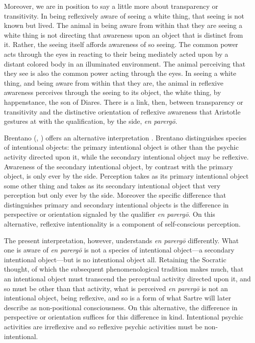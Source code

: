 Moreover, we are in position to say a little more about transparency or transitivity. In being reflexively aware of seeing a white thing, that seeing is not known but lived. The animal in being aware from within that they are seeing a white thing is not directing that awareness upon an object that is distinct from it. Rather, the seeing itself affords awareness of so seeing. The common power acts through the eyes in reacting to their being mediately acted upon by a distant colored body in an illuminated environment. The animal perceiving that they see is also the common power acting through the eyes. In seeing a white thing, and being aware from within that they are, the animal in reflexive awareness perceives through the seeing to its object, the white thing, by happenstance, the son of Diares. There is a link, then, between transparency or transitivity and the distinctive orientation of reflexive awareness that Aristotle gestures at with the qualification, by the side, \emph{en parergō}.

Brentano (\citeyear[2.2.8]{Brentano:1874aa}, \citeyear[1.4, 2.1]{Brentano:1929aa}) offers an alternative interpretation \citep[see][]{Textor:2017aa}. Brentano distinguishes species of intentional objects: the primary intentional object is other than the psychic activity directed upon it, while the secondary intentional object may be reflexive. Awareness of the secondary intentional object, by contrast with the primary object, is only ever by the side. Perception takes as its primary intentional object some other thing and takes as its secondary intentional object that very perception but only ever by the side. Moreover the specific difference that distinguishes primary and secondary intentional objects is the difference in perspective or orientation signaled by the qualifier \emph{en parergō}. On this alternative, reflexive intentionality is a component of self-conscious perception. 

The present interpretation, however, understands \emph{en parergō} differently. What one is aware of \emph{en parergō} is not a species of intentional object—a secondary intentional object—but is no intentional object all. Retaining the Socratic thought, of which the subsequent phenomenological tradition makes much, that an intentional object must transcend the perceptual activity directed upon it, and so must be other than that activity, what is perceived \emph{en parergō} is not an intentional object, being reflexive, and so is a form of what Sartre will later describe as non-positional consciousness. On this alternative, the difference in perspective or orientation suffices for this difference in kind. Intentional psychic activities are irreflexive and so reflexive psychic activities must be non-intentional. 

